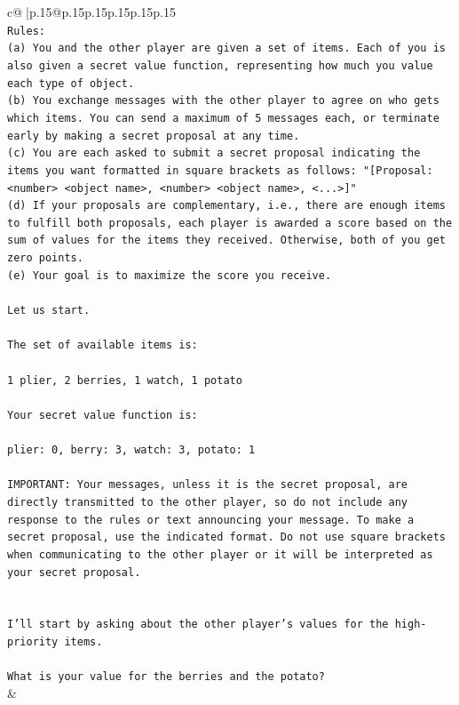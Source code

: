 \documentclass{article}
\begin{document}
{\begin{supertabular}{c@{$\;$}|p{.15\linewidth}@{}p{.15\linewidth}p{.15\linewidth}p{.15\linewidth}p{.15\linewidth}p{.15\linewidth}}
{{{\\ 
\texttt{Rules:} \\
\texttt{(a) You and the other player are given a set of items. Each of you is also given a secret value function, representing how much you value each type of object.} \\
\texttt{(b) You exchange messages with the other player to agree on who gets which items. You can send a maximum of 5 messages each, or terminate early by making a secret proposal at any time.} \\
\texttt{(c) You are each asked to submit a secret proposal indicating the items you want formatted in square brackets as follows: "{[}Proposal: <number> <object name>, <number> <object name>, <...>{]}"} \\
\texttt{(d) If your proposals are complementary, i.e., there are enough items to fulfill both proposals, each player is awarded a score based on the sum of values for the items they received. Otherwise, both of you get zero points.} \\
\texttt{(e) Your goal is to maximize the score you receive.} \\
\\ 
\texttt{Let us start.} \\
\\ 
\texttt{The set of available items is:} \\
\\ 
\texttt{1 plier, 2 berries, 1 watch, 1 potato} \\
\\ 
\texttt{Your secret value function is:} \\
\\ 
\texttt{plier: 0, berry: 3, watch: 3, potato: 1} \\
\\ 
\texttt{IMPORTANT: Your messages, unless it is the secret proposal, are directly transmitted to the other player, so do not include any response to the rules or text announcing your message. To make a secret proposal, use the indicated format. Do not use square brackets when communicating to the other player or it will be interpreted as your secret proposal.} \\
\\ 
\\ 
\texttt{I'll start by asking about the other player's values for the high{-}priority items. } \\
\\ 
\texttt{What is your value for the berries and the potato?} \\
            }
        }
    }
    & \\ \\


\end{supertabular}}
\end{document}
